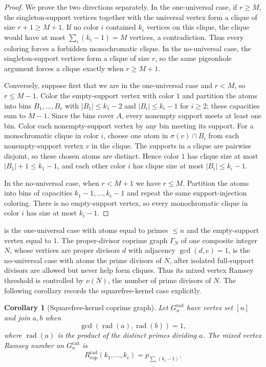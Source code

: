 \documentclass[11pt]{article}
\theoremstyle{plain}
\newtheorem{corollary}[theorem]{Corollary}
\theoremstyle{definition}
\theoremstyle{remark}
\begin{document}
\begin{proof}
We prove the two directions separately.  In the one-universal case, if
$r\ge M$, the singleton-support vertices together with the universal vertex
form a clique of size $r+1\ge M+1$.  If no color $i$ contained $k_i$ vertices
on this clique, the clique would have at most $\sum_i(k_i-1)=M$ vertices, a
contradiction.  Thus every coloring forces a forbidden monochromatic clique.
In the no-universal case, the singleton-support vertices form a clique of
size $r$, so the same pigeonhole argument forces a clique exactly when
$r\ge M+1$.

Conversely, suppose first that we are in the one-universal case and
$r<M$, so $r\le M-1$.  Color the empty-support vertex with color $1$ and
partition the atoms into bins $B_1,\ldots,B_c$ with
$|B_1|\le k_1-2$ and $|B_i|\le k_i-1$ for $i\ge2$; these capacities sum to
$M-1$.  Since the bins cover $A$, every nonempty support meets at least one
bin.  Color each nonempty-support vertex by any bin meeting its support.
For a monochromatic clique in color $i$, choose one atom in
$\sigma(v)\cap B_i$ from each nonempty-support vertex $v$ in the clique.
The supports in a clique are pairwise disjoint, so these chosen atoms are
distinct.  Hence color $1$ has clique size at most $|B_1|+1\le k_1-1$, and
each other color $i$ has clique size at most $|B_i|\le k_i-1$.

In the no-universal case, when $r<M+1$ we have $r\le M$.  Partition the
atoms into bins of capacities $k_1-1,\ldots,k_c-1$ and repeat the same
support-injection coloring.  There is no empty-support vertex, so every
monochromatic clique in color $i$ has size at most $k_i-1$.
\end{proof}

 is the one-universal case with atoms equal to primes
$\le n$ and the empty-support vertex equal to $1$.  The proper-divisor
coprime graph $\Gamma_N$ of one composite integer $N$, whose vertices are
proper divisors $d$ with adjacency $\gcd(d,e)=1$, is the no-universal case
with atoms the prime divisors of $N$, after isolated full-support divisors
are allowed but never help form cliques.  Thus its mixed vertex Ramsey
threshold is controlled by $\nu(N)$, the number of prime divisors of $N$.
The following corollary records the squarefree-kernel case explicitly.

\begin{corollary}[Squarefree-kernel coprime graph]
\label{cor:squarefree-kernel}
Let $G_n^{\mathrm{rad}}$ have vertex set $[n]$ and join $a,b$ when
\[
  \gcd(\operatorname{rad}(a),\operatorname{rad}(b))=1,
\]
where $\operatorname{rad}(a)$ is the product of the distinct primes dividing
$a$.  The mixed vertex Ramsey number on $G_n^{\mathrm{rad}}$ is
\[
  R_{\mathrm{cop}}^{\mathrm{rad}}(k_1,\ldots,k_c)
  =p_{\sum_i(k_i-1)}.
\]
\end{corollary}
\end{document}

